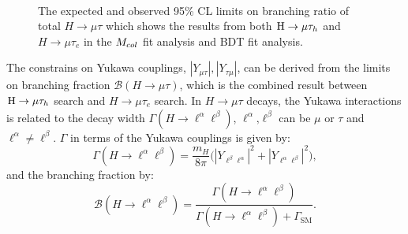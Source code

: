 \begin{figure}[htbp] 
     \centering
     \\
     \caption{The expected and observed 95\% CL limits on branching ratio of total $H \to \mu\tau$ which shows the results from both $\mathrm{H}\to \mu\tau_{h}$ and $H \to \mu\tau_{e}$ in the $M_{col}$ fit analysis and BDT fit analysis.}
     \label{fig:cutbasedpostfit}
\end{figure}



The constrains on Yukawa couplings, $|Y_{\mu\tau}|, |Y_{\tau\mu}|$, can be derived from the limits on branching fraction $\mathcal{B}(H \to \mu \tau)$, which is the combined result between $\mathrm{H}\to \mu\tau_{h}$ search and $H \to \mu\tau_{e}$ search. In $H \to \mu \tau$ decays, the Yukawa interactions is related to the decay width  $\Gamma(H \to \ell^{\alpha}\ell^{\beta})$,  $\ell^{\alpha}\textrm{,}\ell^{\beta}$ can be $\mu$ or $\tau$ and $\ell^{\alpha} \neq \ell^{\beta}$. $\Gamma$ in terms of the Yukawa couplings is given by:
\begin{equation}  
\Gamma(H \to \ell^{\alpha}\ell^{\beta})=\frac{m_{H}}{8\pi}\bigl(|Y_{\ell^{\beta}\ell^{\alpha}}|^2 + |Y_{\ell^{\alpha}\ell^{\beta}}|^2\bigr),\label{eq:Yukawa}
\end{equation}
and the branching fraction by:
\begin{equation}
\mathcal{B}(H \to \ell^{\alpha}\ell^{\beta})=\frac{\Gamma(H\to \ell^{\alpha}\ell^{\beta})}{\Gamma(H\to \ell^{\alpha}\ell^{\beta}) + \Gamma_{\mathrm{SM}}}. \label{eq:Branchingfraction}
\end{equation}

